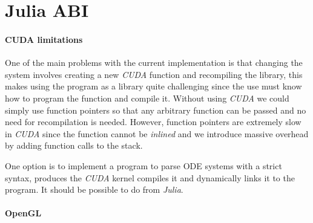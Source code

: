 
\section{Julia ABI}%
\label{sec:abi}

\paragraph{CUDA limitations}

One of the main problems with the current implementation is that changing the system
involves creating a new \emph{CUDA} function and recompiling the library, this makes
using the program as a library quite challenging since the use must know how to
program the function and compile it. Without using \emph{CUDA} we could simply
use function pointers so that any arbitrary function can be passed and no need
for recompilation is needed. However, function pointers are extremely slow in \emph{CUDA}
since the function cannot be \emph{inlined} and we introduce massive overhead by
adding function calls to the stack.

One option is to implement a program to parse ODE systems with a strict syntax,
produces the \emph{CUDA} kernel compiles it and dynamically links it to the
program. It should be possible to do from \emph{Julia}.

\paragraph{OpenGL}

